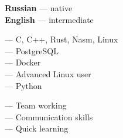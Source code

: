 \documentclass[9pt]{developercv} %
\begin{document}
\begin{minipage}[t]{0.3\textwidth}
	\vspace{-\baselineskip} %

	
	\textbf{Russian} — native\\
	\textbf{English} — intermediate\\
\end{minipage}
\hfill
\begin{minipage}[t]{0.3\textwidth}
	\vspace{-\baselineskip} %
	
    — C, C++, Rust, Nasm, Linux\\
    — PostgreSQL \\
    — Docker \\
    — Advanced Linux user\\
    — Python
\end{minipage}
\hfill
\begin{minipage}[t]{0.3\textwidth}
	\vspace{-\baselineskip} %
	
	— Team working\\
    — Communication skills\\
    — Quick learning
\end{minipage}
\end{document}
